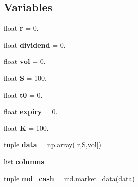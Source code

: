 \subsection*{\-Variables}
\begin{DoxyCompactItemize}
\item 
\hypertarget{namespacestrategy__tester_1_1trade_aaca63c447acc98d6e04b337674adf6c3}{float {\bfseries r} = 0.}\label{namespacestrategy__tester_1_1trade_aaca63c447acc98d6e04b337674adf6c3}

\item 
\hypertarget{namespacestrategy__tester_1_1trade_ab432a163ce98107770b4d3d3f7c4a0cd}{float {\bfseries dividend} = 0.}\label{namespacestrategy__tester_1_1trade_ab432a163ce98107770b4d3d3f7c4a0cd}

\item 
\hypertarget{namespacestrategy__tester_1_1trade_a4955ef687b803b27748614f62b682a0b}{float {\bfseries vol} = 0.}\label{namespacestrategy__tester_1_1trade_a4955ef687b803b27748614f62b682a0b}

\item 
\hypertarget{namespacestrategy__tester_1_1trade_aaf7d89451c64905d1cbbd6d03956437e}{float {\bfseries \-S} = 100.}\label{namespacestrategy__tester_1_1trade_aaf7d89451c64905d1cbbd6d03956437e}

\item 
\hypertarget{namespacestrategy__tester_1_1trade_ad26e61dbd6053dc5da5c796ddebe326c}{float {\bfseries t0} = 0.}\label{namespacestrategy__tester_1_1trade_ad26e61dbd6053dc5da5c796ddebe326c}

\item 
\hypertarget{namespacestrategy__tester_1_1trade_ae627ca70feb2cb2f0292d0a7c5d3a6f3}{float {\bfseries expiry} = 0.}\label{namespacestrategy__tester_1_1trade_ae627ca70feb2cb2f0292d0a7c5d3a6f3}

\item 
\hypertarget{namespacestrategy__tester_1_1trade_a8661d9133875d41f98310b1246704529}{float {\bfseries \-K} = 100.}\label{namespacestrategy__tester_1_1trade_a8661d9133875d41f98310b1246704529}

\item 
\hypertarget{namespacestrategy__tester_1_1trade_a0ee52f2e4ea136acb562309a40431fe7}{tuple {\bfseries data} = np.\-array(\mbox{[}r,\-S,vol\mbox{]})}\label{namespacestrategy__tester_1_1trade_a0ee52f2e4ea136acb562309a40431fe7}

\item 
list {\bfseries columns}
\item 
\hypertarget{namespacestrategy__tester_1_1trade_a66e507858384c1b3c090e00c10bc7e68}{tuple {\bfseries md\-\_\-cash} = md.\-market\-\_\-data(data)}\label{namespacestrategy__tester_1_1trade_a66e507858384c1b3c090e00c10bc7e68}


\end{DoxyCompactItemize}
